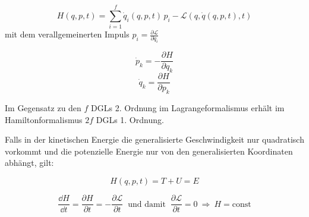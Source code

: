 
\begin{frameddefn}
	\[H(q,p,t) = \sum^f_{i=1} \dot q_i(q,p,t) \, p_i - \mathscr{L}(q, \dot q(q,p,t), t) \]
	mit dem verallgemeinerten Impuls $p_i = \frac{\partial \mathscr{L}}{\partial \dot q_i}$
\end{frameddefn}

\begin{framedprop}
	\[ \dot p_k = - \frac{\partial H}{\partial q_k} \]
	\[ \dot q_k = \frac{\partial H}{\partial p_k} \]
	
	Im Gegensatz zu den $f$ DGLs 2. Ordnung im Lagrangeformalismus erhält im Hamiltonformalismus $2f$ DGLs 1. Ordnung.
\end{framedprop}

\begin{framedthm}[Energieerhaltung]
Falls in der kinetischen Energie die generalisierte Geschwindigkeit nur quadratisch vorkommt und die potenzielle Energie nur von den generalisierten Koordinaten abhängt, gilt:

\[ H(q,p,t) = T + U = E \]

\[ \frac{\dd H}{\dd t} = \frac{\partial H}{\partial t} = -\frac{\partial \mathscr{L}}{\partial t} \ \textrm{ und damit }\  \frac{\partial \mathscr{L}}{\partial t} = 0 \ \Rightarrow \ H = \textrm{const}\]
	
\end{framedthm}
